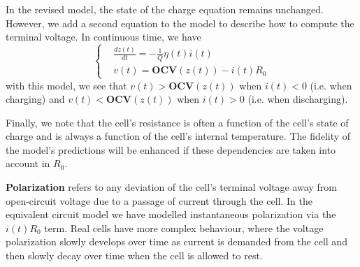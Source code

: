 \documentclass[11pt,a4paper,oneside]{book}
\numberwithin{equation}{section}
\theoremstyle{it}
\theoremstyle{definition}
\begin{document}
In the revised model, the state of the charge equation remains unchanged. However, we add a second equation to the model to describe how to compute the terminal voltage. In continuous time, we have
\begin{equation}
	\left\lbrace \begin{aligned}
		&\frac{dz(t)}{dt} = -\frac{1}{Q}\eta(t)i(t) \\[6pt]
		&v(t) = \mathbf{OCV}(z(t)) - i(t)R_0
	\end{aligned}\right. 
\end{equation}
with this model, we see that $v(t)>\mathbf{OCV}(z(t))$ when $i(t)<0$ (i.e. when charging) and $v(t)<\mathbf{OCV}(z(t))$ when $i(t)>0$ (i.e. when discharging). 

Finally, we note that the cell's resistance is often a function of the cell's state of charge and is always a function of the cell's internal temperature. The fidelity of the model's predictions will be enhanced if these dependencies are taken into account in $R_0$.

\textbf{Polarization} refers to any deviation of the cell's terminal voltage away from open-circuit voltage due to a passage of current through the cell. In the equivalent circuit model we have modelled instantaneous polarization via the $i(t)R_0$ term. Real cells have more complex behaviour, where the voltage polarization slowly develops over time as current is demanded from the cell and then slowly decay over time when the cell is allowed to rest.
\end{document}
